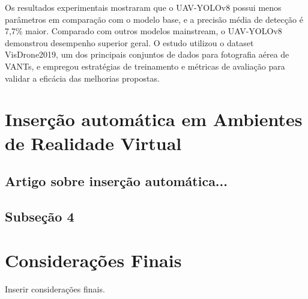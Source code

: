 Os resultados experimentais mostraram que o UAV-YOLOv8 possui menos parâmetros em comparação com o modelo base, e a precisão média de detecção é 7,7\% maior. Comparado com outros modelos mainstream, o UAV-YOLOv8 demonstrou desempenho superior geral. O estudo utilizou o dataset VisDrone2019, um dos principais conjuntos de dados para fotografia aérea de VANTs, e empregou estratégias de treinamento e métricas de avaliação para validar a eficácia das melhorias propostas.

\section{Inserção automática em Ambientes de Realidade Virtual}
\subsection{Artigo sobre inserção automática...}

\subsection{Subseção 4}

\section{Considerações Finais}

Inserir considerações finais.

